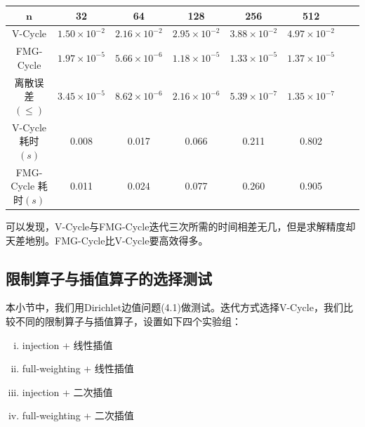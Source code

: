 \documentclass[lang=cn,10pt]{elegantbook}
\begin{document}
\begin{table}[H]
  \centering
  \small
  \begin{tabular}{c|ccccccc}
   $\mathbf{n}$      & 32                   & 64                   & 128                  & 256                  & 512                 \\ \hline
V-Cycle   & $1.50\times 10^{-2}$ & $2.16\times 10^{-2}$ & $2.95\times 10^{-2}$ & $3.88\times 10^{-2}$ & $4.97\times 10^{-2}$  \\
FMG-Cycle   & $1.97\times 10^{-5}$ & $5.66\times 10^{-6}$ & $1.18\times 10^{-5}$ & $1.33\times 10^{-5}$ & $1.37\times 10^{-5}$  \\
离散误差$(\leq)$   & $3.45\times 10^{-5}$ & $8.62\times 10^{-6}$ & $2.16\times 10^{-6}$ & $5.39\times 10^{-7}$ & $1.35\times 10^{-7}$\\
V-Cycle 耗时$(s)$  & 0.008 & 0.017 & 0.066 & 0.211 & 0.802\\
FMG-Cycle 耗时$(s)$ & 0.011 & 0.024 & 0.077 & 0.260 & 0.905
\end{tabular}
\end{table}

可以发现，V-Cycle与FMG-Cycle迭代三次所需的时间相差无几，但是求解精度却天差地别。FMG-Cycle比V-Cycle要高效得多。

\subsection{限制算子与插值算子的选择测试}

本小节中，我们用Dirichlet边值问题(4.1)做测试。迭代方式选择V-Cycle，我们比较不同的限制算子与插值算子，设置如下四个实验组：
\begin{enumerate}[(i)]
  \item injection + 线性插值
  \item full-weighting + 线性插值
  \item injection + 二次插值
  \item full-weighting + 二次插值
\end{enumerate}
\end{document}
